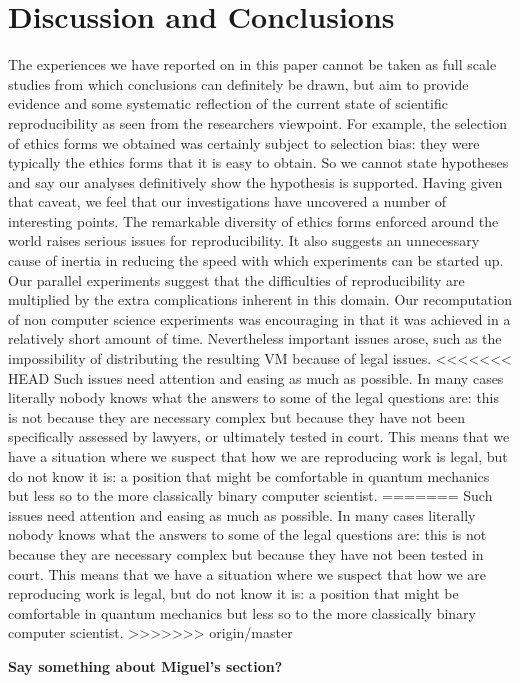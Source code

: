 \section{Discussion and Conclusions}
\label{s:discussion}

The experiences we have reported on in this paper cannot be taken as full scale studies from which conclusions can definitely be drawn, but aim to provide evidence and some systematic reflection of the current state of scientific reproducibility as seen from the researchers viewpoint.  For example, the 
selection of ethics forms we obtained was certainly subject to selection bias: they were typically the ethics forms that it is easy to obtain.  So we cannot state hypotheses and say our analyses definitively show the hypothesis is supported.   Having given that caveat, we feel that our investigations have uncovered a number of interesting points.  The remarkable diversity of ethics forms enforced around the world raises serious issues for reproducibility.  It also suggests an unnecessary cause of inertia in reducing the speed with which experiments can be started up.  Our parallel experiments suggest that the difficulties of reproducibility are 
multiplied by the extra complications inherent in this domain.  Our
recomputation of non computer science experiments was encouraging in
that it was achieved in a relatively short amount of time.
Nevertheless important issues arose, such as the impossibility of
distributing the resulting VM because of legal issues. 
<<<<<<< HEAD
Such issues need attention and easing as much as possible.  In many cases literally nobody knows what the answers to some of the legal questions are: this is not because they are necessary complex but because they have not been specifically assessed by lawyers, or ultimately tested in court.  This means that we have a situation where we suspect that how we are reproducing work is legal, but do not know it is: a position that might be comfortable in quantum mechanics but less so to the more classically binary computer scientist. 
=======
Such issues need attention and easing as much as possible.  In many cases literally nobody knows what the answers to some of the legal questions are: this is not because they are necessary complex but because they have not been tested in court.  This means that we have a situation where we suspect that how we are reproducing work is legal, but do not know it is: a position that might be comfortable in quantum mechanics but less so to the more classically binary computer scientist. 
>>>>>>> origin/master

\textbf{Say something about Miguel's section?}



